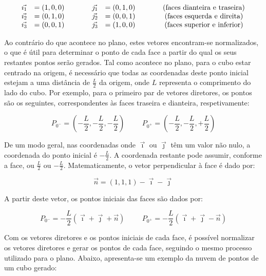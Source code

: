 \documentclass[12pt, a4paper]{article}
\begin{document}
$$
\begin{array}{ll>{\hspace{1cm}}ll>{\hspace{1cm}}c}
    \vec{\imath_1} &= (1, 0, 0) &
    \vec{\jmath_1} &= (0, 1, 0) &
    (\text{faces dianteira e traseira}) \\
    \vec{\imath_2} &= (0, 1, 0) &
    \vec{\jmath_2} &= (0, 0, 1) &
    (\text{faces esquerda e direita}) \\
    \vec{\imath_3} &= (0, 0, 1) &
    \vec{\jmath_3} &= (1, 0, 0) &
    (\text{faces superior e inferior})
\end{array}
$$

Ao contrário do que acontece no plano, estes vetores encontram-se normalizados, o que é útil para
determinar o ponto de cada face a partir do qual os seus restantes pontos serão gerados. Tal como
acontece no plano, para o cubo estar centrado na origem, é necessário que todas as coordenadas deste
ponto inicial estejam a uma distância de $\frac{L}{2}$ da origem, onde $L$ representa o comprimento
do lado do cubo. Por exemplo, para o primeiro par de vetores diretores, os pontos são os seguintes,
correspondentes às faces traseira e dianteira, respetivamente:

$$
P_{0^-} = \left ( -\frac{L}{2}, -\frac{L}{2}, -\frac{L}{2} \right )
\hspace{1cm}
P_{0^+} = \left ( -\frac{L}{2}, -\frac{L}{2}, +\frac{L}{2} \right )
$$

De um modo geral, nas coordenadas onde $\vec{\imath}$ ou $\vec{\jmath}$ têm um valor não nulo, a
coordenada do ponto inicial é $-\frac{L}{2}$. A coordenada restante pode assumir, conforme a face,
ou $\frac{L}{2}$ ou $-\frac{L}{2}$. Matematicamente, o vetor perpendicular à face é dado por:

$$
\vec{n} = (1, 1, 1) - \vec{\imath} - \vec{\jmath}
$$

A partir deste vetor, os pontos iniciais das faces são dados por:

$$
P_{0^-} = -\frac{L}{2} \left ( \vec{\imath} + \vec{\jmath} + \vec{n} \right )
\hspace{1cm}
P_{0^+} = -\frac{L}{2} \left ( \vec{\imath} + \vec{\jmath} - \vec{n} \right )
$$

Com os vetores diretores e os pontos iniciais de cada face, é possível normalizar os vetores
diretores e gerar os pontos de cada face, seguindo o mesmo processo utilizado para o plano. Abaixo,
apresenta-se um exemplo da nuvem de pontos de um cubo gerado:
\end{document}
